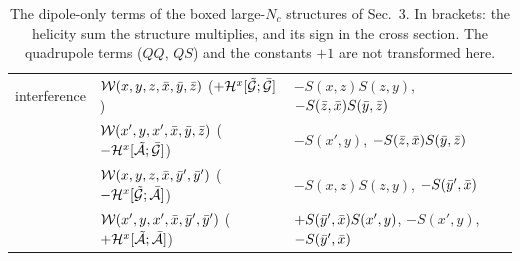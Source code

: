\documentclass[9pt]{article}
\numberwithin{equation}{section}
\begin{document}
\begin{table}[h!]
\begin{tabular}{||l|l|l||}
\hline
interference & $\mathcal{W}(x,y,z,\Bar{x},\Bar{y},\Bar{z})$ \hfill ($+\mathcal{H}^{x}[\Tilde{\mathcal{G}};\Bar{\mathcal{G}}]$) & $-S(x,z)S(z,y)$, \quad $-S(\Bar{z},\Bar{x})S(\Bar{y},\Bar{z})$ \\
 & $\mathcal{W}(x',y,x',\Bar{x},\Bar{y},\Bar{z})$ \hfill ($-\mathcal{H}^{x}[\Tilde{\mathcal{A}};\Bar{\mathcal{G}}]$) & $-S(x',y)$, \quad $-S(\Bar{z},\Bar{x})S(\Bar{y},\Bar{z})$ \\
 & $\mathcal{W}(x,y,z,\Bar{x},\Bar{y}',\Bar{y}')$ \hfill ($-\mathcal{H}^{x}[\Tilde{\mathcal{G}};\Bar{\mathcal{A}}]$) & $-S(x,z)S(z,y)$, \quad $-S(\Bar{y}',\Bar{x})$ \\
 & $\mathcal{W}(x',y,x',\Bar{x},\Bar{y}',\Bar{y}')$ \hfill ($+\mathcal{H}^{x}[\Tilde{\mathcal{A}};\Bar{\mathcal{A}}]$) & $+S(\Bar{y}',\Bar{x})S(x',y)$, \quad $-S(x',y)$, \quad $-S(\Bar{y}',\Bar{x})$ \\
\hline
\end{tabular}
\caption{The dipole-only terms of the boxed large-$N_{c}$ structures of Sec.~3. In brackets: the helicity sum the structure multiplies, and its sign in the cross section. The quadrupole terms ($QQ$, $QS$) and the constants $+1$ are not transformed here.}
\label{tab:dip}
\end{table}
\end{document}
